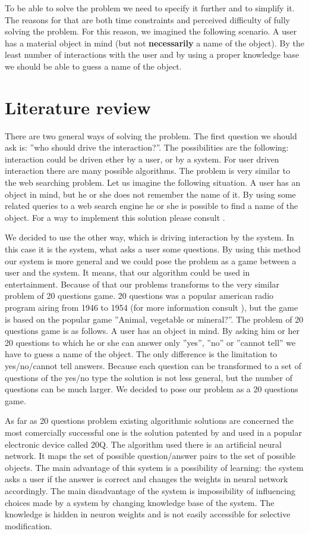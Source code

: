 \documentclass[a4paper]{article}
\begin{document}
To be able to solve the problem we need to specify it further and to simplify it. The reasons for that are both time constraints and perceived difficulty of fully solving the problem. For this reason, we imagined the following scenario. A user has a material object in mind (but not \textbf{necessarily} a name of the object). By the least number of interactions with the user and by using a proper knowledge base we should be able to guess a name of the object. 
\section{Literature review}
There are two general ways of solving the problem. The first question we should ask is: ''who should drive the interaction?''. The possibilities are the following: interaction could be driven ether by a user, or by a system. For user driven interaction there are many possible algorithms. The problem is very similar to the web searching problem. Let us imagine the following situation. A user has an object in mind, but he or she does not remember the name of it. By using some related queries to a web search engine he or she is possible to find a name of the object. For a way to implement this solution please consult \citet{Google}.

We decided to use the other way, which is driving interaction by the system. In this case it is the system, what asks a user some questions. By using this method our system is more general and we could pose the problem as a game between a user and the system. It means, that our algorithm could be used in entertainment. Because of that our problems transforms to the very similar problem of 20 questions game. 20 questions was a popular american radio program airing from 1946 to 1954 (for more information consult \citet{Radio}), but the game is based on the popular game ''Animal, vegetable or mineral?''. The problem of 20 questions game is as follows. A user has an object in mind. By asking him or her 20 questions to which he or she can answer only ''yes'', ''no'' or ''cannot tell'' we have to guess a name of the object. The only difference is the limitation to yes/no/cannot tell answers. Because each question can be transformed to a set of questions of the yes/no type the solution is not less general, but the number of questions can be much larger. We decided to pose our problem as a 20 questions game. 

As far as 20 questions problem existing algorithmic solutions are concerned the most comercially successful one is the solution patented by \citet{20Q} and used in a popular electronic device called 20Q. The algorithm used there is an artificial neural network. It maps the set of possible question/answer pairs to the set of possible objects. The main advantage of this system is a possibility of learning: the system asks a user if the answer is correct and changes the weights in neural network accordingly. The main disadvantage of the system is impossibility of influencing choices made by a system by changing knowledge base of the system. The knowledge is hidden in neuron weights and is not easily accessible for selective modification.
\end{document}
